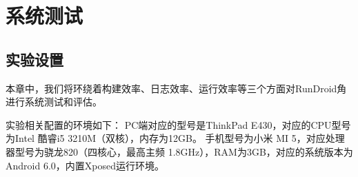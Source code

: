 \chapter{系统测试}  
\label{chp:testing}

\section{实验设置}

本章中，我们将环绕着构建效率、日志效率、运行效率等三个方面对RunDroid角进行系统测试和评估。

实验相关配置的环境如下：
PC端对应的型号是ThinkPad E430，对应的CPU型号为Intel 酷睿i5 3210M（双核），内存为12GB。
手机型号为小米 MI 5，对应处理器型号为骁龙820（四核心，最高主频 1.8GHz），RAM为3GB，对应的系统版本为Android 6.0，内置Xposed运行环境。


